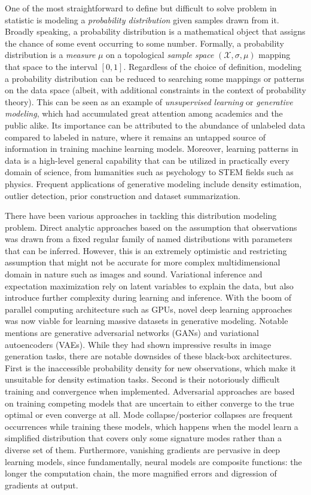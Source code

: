 One of the most straightforward to define but difficult to solve problem in
statistic is modeling a \textit{probability distribution} given samples drawn
from it. Broadly speaking, a probability distribution is a mathematical object
that assigns the chance of some event occurring to some number. Formally, a
probability distribution is a \textit{measure} $\mu$ on a topological
\textit{sample space} $(\mathcal{X}, \sigma, \mu)$ mapping that space to the
interval $[0,1]$. Regardless of the choice of definition, modeling a probability
distribution can be reduced to searching some mappings or patterns on the data
space (albeit, with additional constraints in the context of probability
theory). This can be seen as an example of \textit{unsupervised learning} or
\textit{generative modeling}, which had accumulated great attention among
academics and the public alike. Its importance can be attributed to the
abundance of unlabeled data compared to labeled in nature, where it remains an
untapped source of information in training machine learning models. Moreover,
learning patterns in data is a high-level general capability that can be
utilized in practically every domain of science, from humanities such as
psychology to STEM fields such as physics. Frequent applications of generative
modeling include density estimation, outlier detection, prior construction and
dataset summarization.

There have been various approaches in tackling this distribution modeling problem.
Direct analytic approaches based on the assumption that observations was drawn
from a fixed regular family of named distributions with parameters that can be
inferred. However, this is an extremely optimistic and restricting assumption that might
not be accurate for more complex multidimensional domain in
nature such as images and sound. Variational inference and expectation
maximization rely on latent variables to explain the data, but also introduce
further complexity during learning and inference. With the boom of parallel
computing architecture such as GPUs, novel deep learning approaches was now
viable for learning massive datasets in generative modeling. Notable mentions are generative adversarial
networks (GANs) and variational autoencoders (VAEs). While they had shown
impressive results in image generation tasks, there are notable downsides of
these black-box architectures. First is the inaccessible probability density for
new observations, which make it unsuitable for density estimation tasks. Second
is their notoriously difficult training and convergence when implemented. Adversarial
approaches are based on training competing models that are uncertain to
either converge to the true optimal or even converge at all. Mode
collapse/posterior collapses are frequent occurrences while training these
models, which happens when the model learn a simplified distribution that covers
only some signature modes rather than a diverse set of them. Furthermore,
vanishing gradients are pervasive in deep learning models, since fundamentally,
neural models are composite functions: the longer the computation chain, the
more magnified errors and digression of gradients at output.

